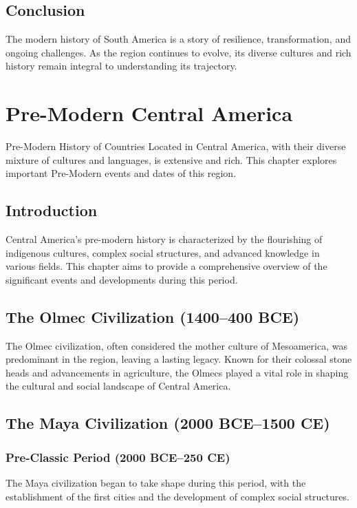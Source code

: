 \documentclass[a4paper,12pt]{book}
\begin{document}
\section{Conclusion}
\label{sec:conclusion-modern-south-america}
The modern history of South America is a story of resilience, transformation, and ongoing challenges. As the region continues to evolve, its diverse cultures and rich history remain integral to understanding its trajectory.

\chapter{Pre-Modern Central America}
\label{ch:pre-modern-history-central-america}

Pre-Modern History of Countries Located in Central America, with their diverse mixture of cultures and languages, is extensive and rich. This chapter explores important Pre-Modern events and dates of this region.

\section{Introduction}
\label{sec:introduction-pre-modern-central-america}
Central America’s pre-modern history is characterized by the flourishing of indigenous cultures, complex social structures, and advanced knowledge in various fields. This chapter aims to provide a comprehensive overview of the significant events and developments during this period.

\section{The Olmec Civilization (1400–400 BCE)}
\label{sec:olmec-civilization}
The Olmec civilization, often considered the mother culture of Mesoamerica, was predominant in the region, leaving a lasting legacy. Known for their colossal stone heads and advancements in agriculture, the Olmecs played a vital role in shaping the cultural and social landscape of Central America.

\section{The Maya Civilization (2000 BCE–1500 CE)}
\label{sec:mayan-civilization}
\subsection{Pre-Classic Period (2000 BCE–250 CE)}
\label{subsec:pre-classic-maya}
The Maya civilization began to take shape during this period, with the establishment of the first cities and the development of complex social structures.
\end{document}
